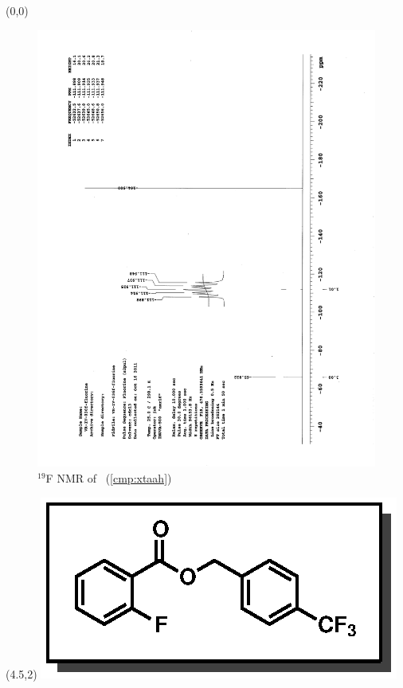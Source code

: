 \clearpage
\begin{textblock}{20}(0,0)
\begin{figure}[htb]
\caption{$^{19}$F NMR of  \CMPxtaah\ (\ref{cmp:xtaah})}
\includegraphics[scale=0.75, trim = 0mm 0mm 0mm 5mm,
clip]{chp_asymmetric/images/nmr/xtaahF}
\vspace{-100pt}
\end{figure}
\end{textblock}
\begin{textblock}{1}(4.5,2)
\includegraphics[scale=0.8, angle=90]{chp_asymmetric/images/xtaah}
\end{textblock}
\clearpage

